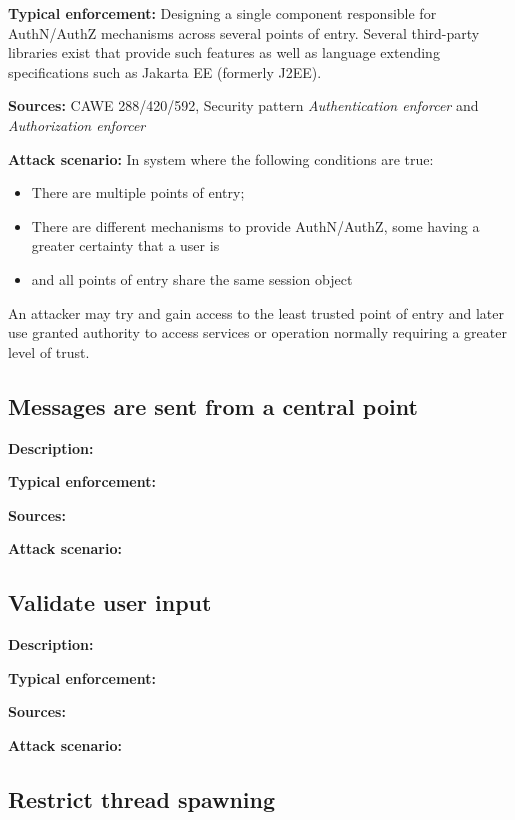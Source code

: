  \textbf{Typical enforcement:} Designing a single component responsible for AuthN/AuthZ mechanisms across several points of entry. Several third-party libraries exist that provide such features as well as language extending specifications such as Jakarta EE (formerly J2EE). 
 
 \textbf{Sources:} CAWE 288/420/592, Security pattern \textit{Authentication enforcer} and \textit{Authorization enforcer}
 
 \textbf{Attack scenario:} In system where the following conditions are true:
 
 \begin{itemize}
     \item There are multiple points of entry; 
     \item There are different mechanisms to provide AuthN/AuthZ, some having a greater certainty that a user is 
     \item and all points of entry share the same session object
 \end{itemize}
 
  An attacker may try and gain access to the least trusted point of entry and later use granted authority to access services or operation normally requiring a greater level of trust.

\subsection{Messages are sent from a central point} 

\textbf{Description:} 
 
 \textbf{Typical enforcement:}
 
 \textbf{Sources:}
 
 \textbf{Attack scenario:}

\subsection{Validate user input}  

\textbf{Description:} 
 
 \textbf{Typical enforcement:}
 
 \textbf{Sources:}
 
 \textbf{Attack scenario:}

\subsection{Restrict thread spawning} 

